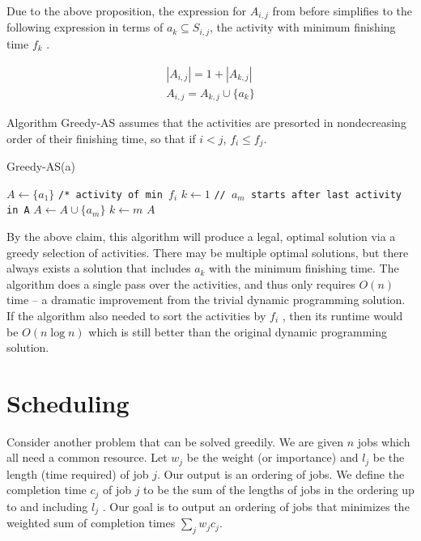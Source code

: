\documentclass [12pt]{article}
\theoremstyle{definition}
\begin{document}
Due to the above proposition, the expression for $A_{i ,j}$ from before simplifies to the following
expression in terms of $a_k \subseteq S_{i ,j}$, the activity with minimum finishing time $f_k$ .

\begin{align*}
|A_{i,j}| = 1 + |A_{k,j}| \\
A_{i,j} = A_{k,j} \cup \{a_k \}
\end{align*}

Algorithm Greedy-AS assumes that the activities are presorted in nondecreasing order of their finishing time, so that if $i < j$, $f_i \leq f_j$.

\begin{algorithm}
\caption{Greedy-AS(a)}
\label{alg:greed_as}
\begin{algorithmic}
\State $A \gets \{a_1\}$ \texttt{/* activity of min $f_i$}
\State $k \gets 1$
\State {} {
    \State {} {
        \State \texttt{// $a_m$ starts after last activity in A}
        \State $A \gets A \cup \{a_m\}$
        \State $k \gets m$
    }
}
\State \Return $A$
\end{algorithmic}
\end{algorithm}


By the above claim, this algorithm will produce a legal, optimal solution via a greedy selection of activities. There may be multiple optimal solutions, but there always exists a solution that includes $a_k$ with the minimum finishing time. The algorithm does a single pass over the activities, and thus only requires $O(n)$ time – a dramatic improvement from the trivial dynamic programming solution. If the algorithm also needed to sort the activities by $f_i$ , then its runtime would be $O(n \log n)$ which is still better than the original dynamic programming solution.

\section{Scheduling}

Consider another problem that can be solved greedily. We are given $n$ jobs which all need a common resource. Let $w_j$ be the weight (or importance) and $l_j$ be the length (time required) of job $j$. Our output is an ordering of jobs. We define the completion time $c_j$ of job $j$ to be the sum of the lengths of jobs in the ordering up to and including $l_j$ . Our goal is to output an ordering of jobs that minimizes the weighted sum of completion times $\sum_{j} w_jc_j$.
\end{document}
